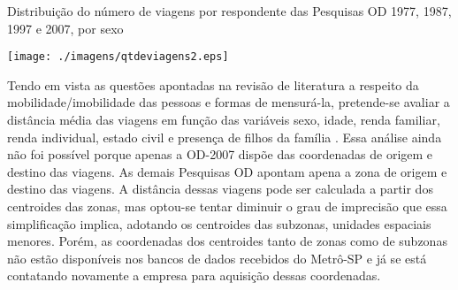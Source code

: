 \begin{table}[htb]
\end{table}


\begin{grafico}[htb]%
    \caption{\label{graf:distr-num-viag}Distribuição do número de viagens por respondente das Pesquisas OD 1977, 1987, 1997 e 2007, por sexo}%
    \begin{center}%
        \texttt{[image: ./imagens/qtdeviagens2.eps]}%
    \end{center}%
\end{grafico}%

\clearpage

Tendo em vista as questões apontadas na revisão de literatura a respeito da mobilidade/imobilidade das pessoas e formas de mensurá-la, pretende-se avaliar a distância média das viagens em função das variáveis sexo, idade, renda familiar, renda individual, estado civil e presença de filhos da família \cite{ROSENBLOOM2006,SHEARMUR2006,HANSON2010}. Essa análise ainda não foi possível porque apenas a OD-2007 dispõe das coordenadas de origem e destino das viagens. As demais Pesquisas OD apontam apena a zona de origem e destino das viagens. A distância dessas viagens pode ser calculada a partir dos centroides das zonas, mas optou-se tentar diminuir o grau de imprecisão que essa simplificação implica, adotando os centroides das subzonas, unidades espaciais menores. Porém, as coordenadas dos centroides tanto de zonas como de subzonas não estão disponíveis nos bancos de dados recebidos do Metrô-SP e já se está contatando novamente a empresa para aquisição dessas coordenadas.

